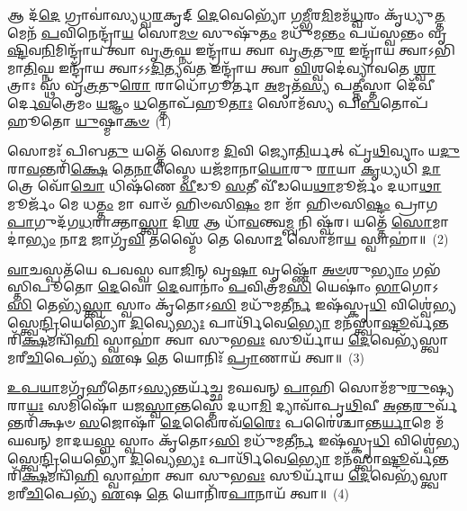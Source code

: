 \setcounter{anuvakam}{0}
𑌆 𑌦᳴\-\ul{𑌦𑍇} 𑌗𑍍𑌰𑌾𑌵𑌾॑𑌸𑍍𑌯𑌧𑍍𑌵\-\ul{𑌰}\-𑌕𑍃𑌦𑍍 \ul{𑌦𑍇}\-𑌵𑍇𑌭𑍍𑌯𑍋᳴ 𑌗\-\ul{𑌮𑍍𑌭𑍀}\-𑌰\-\ul{𑌮𑌿}\-𑌮𑌮᳴\-\ul{𑌧𑍍𑌵}\-𑌰𑌂 𑌕𑍃᳴𑌧𑍍𑌯𑍁\-\ul{𑌤𑍍𑌤}\-𑌮𑍇𑌨᳴ \ul{𑌪}\-𑌵𑌿𑌨𑍇𑌨𑍍𑌦𑍍𑌰𑌾᳴\-\ul{𑌯} 𑌸𑍋\-\ul{𑌮}\-\-\ul{𑍞} 𑌸𑍁𑌷𑍁᳴\-\ul{𑌤𑌂} 𑌮𑌧𑍁᳴𑌮\-\ul{𑌨𑍍𑌤𑌂} 𑌪𑌯᳴𑌸𑍍𑌵𑌨𑍍𑌤𑌂 𑌵𑍃\-\ul{𑌷𑍍𑌟𑌿}\-𑌵\-\ul{𑌨𑌿}\-𑌮𑌿𑌨𑍍𑌦𑍍𑌰𑌾᳴𑌯 𑌤𑍍𑌵𑌾 𑌵𑍃\-\ul{𑌤𑍍𑌰}\-𑌘𑍍𑌨 𑌇𑌨𑍍𑌦𑍍𑌰𑌾᳴𑌯 𑌤𑍍𑌵𑌾 𑌵𑍃\-\ul{𑌤𑍍𑌰}\-𑌤𑍁\-\ul{𑌰} 𑌇𑌨𑍍𑌦𑍍𑌰𑌾᳴𑌯 𑌤𑍍𑌵𑌾\-𑌽𑌭𑌿𑌮𑌾\-\ul{𑌤𑌿}\-𑌘𑍍𑌨 𑌇𑌨𑍍𑌦𑍍𑌰𑌾᳴𑌯 𑌤𑍍𑌵𑌾\-𑌽\-𑌽\-\ul{𑌦𑌿}\-𑌤𑍍𑌯𑌵᳴\-\ul{𑌤} 𑌇𑌨𑍍𑌦𑍍𑌰𑌾᳴𑌯 𑌤𑍍𑌵𑌾 \ul{𑌵𑌿}\-𑌶𑍍𑌵𑌦𑍇॑𑌵𑍍𑌯𑌾𑌵𑌤𑍇 \ul{𑌶𑍍𑌵𑌾}\-𑌤𑍍𑌰𑌾𑌃 𑌸𑍍𑌥᳴ 𑌵𑍃\-\ul{𑌤𑍍𑌰}\-𑌤𑍁\-\ul{𑌰𑍋} 𑌰𑌾𑌧𑍋᳴𑌗𑍂𑌰𑍍𑌤𑌾 \ul{𑌅}\-𑌮𑍃𑌤᳴\-\ul{𑌸𑍍𑌯} 𑌪\-\ul{𑌤𑍍𑌨𑍀}\-𑌸𑍍𑌤𑌾 𑌦𑍇᳴𑌵𑍀𑌰𑍍𑌦𑍇\-\ul{𑌵}\-𑌤𑍍𑌰𑍇𑌮𑌂 \ul{𑌯}\-𑌜𑍍𑌞𑌂 \ul{𑌧}\-𑌤𑍍𑌤𑍋𑌪᳴𑌹𑍂\-\ul{𑌤𑌾𑌃} 𑌸𑍋𑌮᳴𑌸𑍍𑌯 𑌪𑌿\-\ul{𑌬}\-𑌤𑍋𑌪᳴𑌹𑍂𑌤𑍋 \ul{𑌯𑍁}\-𑌷𑍍𑌮𑌾\-\ul{𑌕}\-\-\ul{𑍞}\-~(1)

𑌸𑍋𑌮𑌃᳴ 𑌪𑌿𑌬\-\ul{𑌤𑍁} 𑌯𑌤𑍍𑌤𑍇᳴ 𑌸𑍋𑌮 \ul{𑌦𑌿}\-𑌵𑌿 𑌜𑍍𑌯𑍋\-\ul{𑌤𑌿}\-𑌰𑍍𑌯𑌤𑍍 𑌪𑍃᳴\-\ul{𑌥𑌿}\-𑌵𑍍𑌯𑌾𑌂 𑌯\-\ul{𑌦𑍁}\-𑌰𑌾\-\ul{𑌵}\-𑌨𑍍𑌤𑌰𑌿᳴\-\ul{𑌕𑍍𑌷𑍇} 𑌤𑍇\-\ul{𑌨𑌾}\-𑌸𑍍𑌮𑍈 𑌯𑌜᳴𑌮𑌾𑌨𑌾\-\ul{𑌯𑍋}\-𑌰𑍁 \ul{𑌰𑌾}\-𑌯𑌾 \ul{𑌕𑍃}\-𑌧𑍍𑌯𑌧𑌿᳴ \ul{𑌦𑌾}\-𑌤𑍍𑌰𑍇 𑌵𑍋᳴\-\ul{𑌚𑍋} 𑌧𑌿𑌷᳴𑌣𑍇 \ul{𑌵𑍀}\-𑌡𑍂 \ul{𑌸}\-𑌤𑍀 𑌵𑍀᳴𑌡𑌯𑍇\-\ul{𑌥𑌾}\-𑌮𑍂𑌰𑍍𑌜𑌂᳴ 𑌦𑌧𑌾\-\ul{𑌥𑌾}\-𑌮𑍂𑌰𑍍𑌜𑌂᳴ 𑌮𑍇 𑌧\-\ul{𑌤𑍍𑌤𑌂} 𑌮𑌾 𑌵𑌾𑍞᳴ 𑌹𑌿𑍞𑌸𑌿\-\ul{𑌷𑌂} 𑌮𑌾 𑌮𑌾᳴ 𑌹𑌿𑍞𑌸𑌿\-\ul{𑌷𑍍𑌟𑌂} 𑌪𑍍𑌰𑌾𑌗\-\ul{𑌪𑌾}\-𑌗𑍁𑌦᳴𑌗\-\ul{𑌧}\-𑌰𑌾𑌕𑍍𑌤𑌾\-\ul{𑌸𑍍𑌤𑍍𑌵𑌾} 𑌦𑌿\-\ul{𑌶} 𑌆 𑌧𑌾᳴\-\ul{𑌵}\-𑌨𑍍𑌤𑍍𑌵\-\ul{𑌮𑍍𑌬} 𑌨𑌿 𑌷𑍍𑌵᳴𑌰। 𑌯𑌤𑍍𑌤𑍇᳴ \ul{𑌸𑍋}\-𑌮𑌾𑌦𑌾॑\-\ul{𑌭𑍍𑌯𑌂} 𑌨𑌾\-\ul{𑌮} 𑌜𑌾𑌗𑍃᳴\-\ul{𑌵𑌿} 𑌤𑌸𑍍𑌮𑍈᳴ 𑌤𑍇 𑌸𑍋\-\ul{𑌮} 𑌸𑍋𑌮𑌾᳴\-\ul{𑌯} 𑌸𑍍𑌵𑌾𑌹𑌾॑॥~(2)

{\anuvakamend[{\-\ul{𑌯𑍁}\-𑌷𑍍𑌮𑌾𑌕𑍟᳴ 𑌸𑍍𑌵\-\ul{𑌰} 𑌯\-\ul{𑌤𑍍𑌤𑍇} 𑌨𑌵᳴ 𑌚}]}%

\-\ul{𑌵𑌾}\-𑌚𑌸𑍍𑌪𑌤᳴𑌯𑍇 𑌪𑌵𑌸𑍍𑌵 𑌵𑌾\-\ul{𑌜𑌿}\-𑌨𑍍 𑌵𑍃\-\ul{𑌷𑌾} 𑌵𑍃𑌷𑍍𑌣𑍋᳴ \ul{𑌅}\-\-\ul{𑍞}\-𑌶𑍁\-\ul{𑌭𑍍𑌯𑌾𑌂} 𑌗𑌭᳴𑌸𑍍𑌤𑌿𑌪𑍂𑌤𑍋 \ul{𑌦𑍇}\-𑌵𑍋 \ul{𑌦𑍇}\-𑌵𑌾𑌨𑌾𑌂॑ \ul{𑌪}\-𑌵𑌿𑌤𑍍𑌰᳴𑌮\-\ul{𑌸𑌿} 𑌯𑍇𑌷𑌾𑌂॑ \ul{𑌭𑌾}\-𑌗𑍋\-𑌽\-\ul{𑌸𑌿} 𑌤𑍇𑌭𑍍𑌯᳴\-\ul{𑌸𑍍𑌤𑍍𑌵𑌾} 𑌸𑍍𑌵𑌾𑌂 𑌕𑍃᳴𑌤𑍋\-𑌽\-\ul{𑌸𑌿} 𑌮𑌧𑍁᳴𑌮𑌤𑍀\-\ul{𑌰𑍍𑌨} 𑌇𑌷᳴𑌸𑍍𑌕𑍃\-\ul{𑌧𑌿} 𑌵𑌿𑌶𑍍𑌵𑍇॑𑌭𑍍𑌯𑌸𑍍𑌤𑍍𑌵𑍇\-\ul{𑌨𑍍𑌦𑍍𑌰𑌿}\-𑌯𑍇𑌭𑍍𑌯𑍋᳴ \ul{𑌦𑌿}\-𑌵𑍍𑌯𑍇\-\ul{𑌭𑍍𑌯𑌃} 𑌪𑌾𑌰𑍍𑌥𑌿᳴𑌵𑍇\-\ul{𑌭𑍍𑌯𑍋} 𑌮𑌨᳴𑌸𑍍𑌤𑍍𑌵𑌾\-\ul{𑌷𑍍𑌟𑍂}\-𑌰𑍍𑌵᳴𑌨𑍍𑌤\-𑌰𑌿᳴\-\ul{𑌕𑍍𑌷}\-𑌮𑌨𑍍𑌵𑌿᳴\-\ul{𑌹𑌿} 𑌸𑍍𑌵𑌾𑌹𑌾॑ 𑌤𑍍𑌵𑌾 𑌸𑍁𑌭\-\ul{𑌵𑌃} 𑌸𑍂𑌰𑍍𑌯𑌾᳴𑌯 \ul{𑌦𑍇}\-𑌵𑍇𑌭𑍍𑌯᳴𑌸𑍍𑌤𑍍𑌵𑌾 𑌮𑌰𑍀\-\ul{𑌚𑌿}\-𑌪𑍇𑌭𑍍𑌯᳴ \ul{𑌏}\-𑌷 \ul{𑌤𑍇} 𑌯𑍋𑌨𑌿𑌃᳴ \ul{𑌪𑍍𑌰𑌾}\-𑌣𑌾𑌯᳴ 𑌤𑍍𑌵𑌾॥~(3)

{\anuvakamend[{\-\ul{𑌵𑌾}\-𑌚𑌃 \ul{𑌸}\-𑌪𑍍𑌤𑌚᳴𑌤𑍍𑌵𑌾𑌰𑌿𑍞𑌶𑌤𑍍}]}%

\-\ul{𑌉}\-\-\ul{𑌪}\-\-\ul{𑌯𑌾}\-𑌮𑌗𑍃᳴𑌹𑍀𑌤𑍋\-𑌽\-\ul{𑌸𑍍𑌯}\-𑌨𑍍𑌤𑌰𑍍𑌯᳴𑌚𑍍𑌛 𑌮𑌘𑌵𑌨𑍍 \ul{𑌪𑌾}\-𑌹𑌿 𑌸𑍋𑌮᳴𑌮𑍁\-\ul{𑌰𑍁}\-𑌷𑍍𑌯 𑌰𑌾\-\ul{𑌯𑌃} 𑌸𑌮𑌿𑌷𑍋᳴ 𑌯𑌜\-\ul{𑌸𑍍𑌵𑌾}\-𑌨𑍍𑌤𑌸𑍍𑌤𑍇᳴ 𑌦𑌧𑌾\-\ul{𑌮𑌿} 𑌦𑍍𑌯𑌾𑌵𑌾᳴𑌪𑍃\-\ul{𑌥𑌿}\-𑌵𑍀 \ul{𑌅}\-𑌨𑍍𑌤\-\ul{𑌰𑍁}\-𑌰𑍍𑌵᳴𑌨𑍍𑌤𑌰𑌿᳴𑌕𑍍𑌷𑍞 \ul{𑌸}\-𑌜𑍋𑌷𑌾᳴ \ul{𑌦𑍇}\-𑌵𑍈𑌰𑌵᳴\-\ul{𑌰𑍈𑌃} 𑌪𑌰𑍈॑𑌶𑍍𑌚𑌾𑌨𑍍𑌤\-\ul{𑌰𑍍𑌯𑌾}\-𑌮𑍇 𑌮᳴𑌘𑌵𑌨𑍍 𑌮𑌾𑌦𑌯\-\ul{𑌸𑍍𑌵} 𑌸𑍍𑌵𑌾𑌂 𑌕𑍃᳴𑌤𑍋\-𑌽\-\ul{𑌸𑌿} 𑌮𑌧𑍁᳴𑌮𑌤𑍀\-\ul{𑌰𑍍𑌨} 𑌇𑌷᳴𑌸𑍍𑌕𑍃\-\ul{𑌧𑌿} 𑌵𑌿𑌶𑍍𑌵𑍇॑𑌭𑍍𑌯𑌸𑍍𑌤𑍍𑌵𑍇\-\ul{𑌨𑍍𑌦𑍍𑌰𑌿}\-𑌯𑍇𑌭𑍍𑌯𑍋᳴ \ul{𑌦𑌿}\-𑌵𑍍𑌯𑍇\-\ul{𑌭𑍍𑌯𑌃} 𑌪𑌾𑌰𑍍𑌥𑌿᳴𑌵𑍇\-\ul{𑌭𑍍𑌯𑍋} 𑌮𑌨᳴𑌸𑍍𑌤𑍍𑌵𑌾\-\ul{𑌷𑍍𑌟𑍂}\-𑌰𑍍𑌵᳴𑌨𑍍𑌤\-𑌰𑌿᳴\-\ul{𑌕𑍍𑌷}\-𑌮𑌨𑍍𑌵𑌿᳴\-\ul{𑌹𑌿} 𑌸𑍍𑌵𑌾𑌹𑌾॑ 𑌤𑍍𑌵𑌾 𑌸𑍁𑌭\-\ul{𑌵𑌃} 𑌸𑍂𑌰𑍍𑌯𑌾᳴𑌯 \ul{𑌦𑍇}\-𑌵𑍇𑌭𑍍𑌯᳴𑌸𑍍𑌤𑍍𑌵𑌾 𑌮𑌰𑍀\-\ul{𑌚𑌿}\-𑌪𑍇𑌭𑍍𑌯᳴ \ul{𑌏}\-𑌷 \ul{𑌤𑍇} 𑌯𑍋𑌨𑌿᳴𑌰\-\ul{𑌪𑌾}\-𑌨𑌾𑌯᳴ 𑌤𑍍𑌵𑌾॥~(4)

